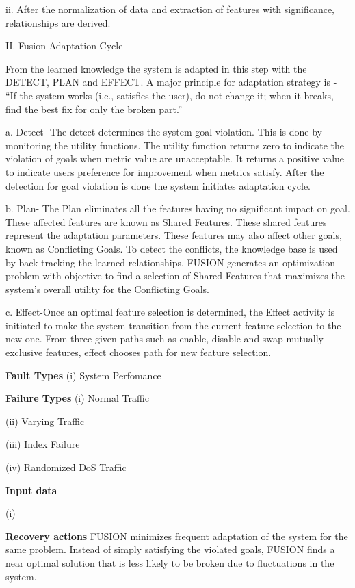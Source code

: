 \begin{compactitem}
ii. After the normalization of data and extraction of features with significance, relationships are derived.

II. Fusion Adaptation Cycle

From the learned knowledge the system is adapted in this step with the DETECT, PLAN and EFFECT. A major principle for adaptation strategy is - “If the system works (i.e., satisfies the user), do not change it; when it breaks, find the best fix for only the broken part.” 

a. Detect- The detect determines the system goal violation. This is done by monitoring the utility 
functions. The utility function returns zero to indicate the violation of goals when metric 
value are unacceptable. It returns a positive value to indicate users preference for improvement when metrics satisfy. After the detection for goal violation is done the system initiates adaptation cycle.

b. Plan- The Plan eliminates all the features having no significant impact on goal. These affected features are known as Shared Features. These shared features represent the adaptation 
parameters. These features may also affect other goals, known as Conflicting Goals. To detect 
the conflicts, the knowledge base is used by back-tracking the learned relationships. FUSION 
generates an optimization problem with objective to find a selection of Shared Features that 
maximizes the system’s overall utility for the Conflicting Goals.

c. Effect-Once an optimal feature selection is determined, the Effect activity is initiated to make the system transition from the current feature selection to the new one. From three given paths such as enable, disable and swap mutually exclusive features, effect chooses path for new 
feature selection.
\item[\textbf{Fault Types}](i) System Perfomance
 
\item[\textbf{Failure Types}]
(i) Normal Traffic

(ii) Varying Traffic

(iii) Index Failure 

(iv) Randomized DoS Traffic
\item[\textbf{Input data}] 

(i)
\item[\textbf{Recovery actions}]
FUSION minimizes frequent adaptation of the system for the same problem. Instead of simply satisfying the violated goals, FUSION finds a near optimal solution that is less likely to be broken due to fluctuations in the system.


\end{compactitem}
